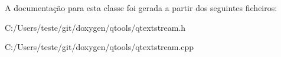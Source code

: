 A documentação para esta classe foi gerada a partir dos seguintes ficheiros\-:\begin{DoxyCompactItemize}
\item 
C\-:/\-Users/teste/git/doxygen/qtools/qtextstream.\-h\item 
C\-:/\-Users/teste/git/doxygen/qtools/qtextstream.\-cpp\end{DoxyCompactItemize}
